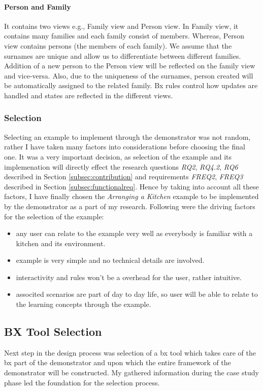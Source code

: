 \paragraph{Person and Family}
It contains two views e.g., Family view and Person view. In Family view, it contains many families and each family consist of members. Whereas, Person view contains persons (the members of each family). We assume that the surnames are unique and allow us to differentiate between different families. Addition of a new person to the Person view will be reflected on the family view and vice-versa. Also, due to the uniqueness of the surnames, person created will be automatically assigned to the related family. Bx rules control how updates are handled and states are reflected in the different views.

\subsubsection{Selection}\label{subsubsec:exampleselection}
Selecting an example to implement through the demonstrator was not random, rather I have taken many factors into considerations before choosing the final one. It was a very important decision, as selection of the example and its implemenation will directly effect the research questions \textit{RQ2}, \textit{RQ4.2}, \textit{RQ6} described in Section \ref{subsec:contribution} and requirements \textit{FREQ2}, \textit{FREQ3} described in Section \ref{subsec:functionalreq}.
\newline\newline Hence by taking into account all these factors, I have finally chosen the \textit{Arranging a Kitchen} example to be implemented by the demonstrator as a part of my research. Following were the driving factors for the selection of the example:
\begin{itemize}
	\item {any user can relate to the example very well as everybody is familiar with a kitchen and its environment.}
	\item {example is very simple and no technical details are involved.}
	\item {interactivity and rules won't be a overhead for the user, rather intuitive.}
	\item {associted scenarios are part of day to day life, so user will be able to relate to the learning concepts through the example.}
\end{itemize}

\subsection{BX Tool Selection}\label{subsec:bxtoolselection}
Next step in the design process was selection of a bx tool which takes care of the bx part of the demonstrator and upon which the entire framework of the demonstrator will be constructed. My gathered information during the case study phase led the foundation for the selection process.
